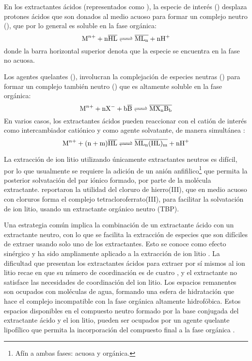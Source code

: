 En los extractantes ácidos (representados como ), la especie de interés () desplaza protones ácidos que son donados al medio acuoso para formar un complejo neutro (), que por lo general es soluble en la fase orgánica:
\begin{equation}
    \ce{M^{n+} + n\overline{HL} <=> \overline{ML_n} + nH^+}
\end{equation}
donde la barra horizontal superior denota que la especie se encuentra en la fase no acuosa. 

Los agentes quelantes (), involucran la complejación de especies neutras () para formar un complejo también neutro () que es altamente soluble en la fase orgánica:
\begin{equation}
    \ce{M^{n+} + nX^{-} + b\overline{B} <=> \overline{MX_nB_b}}
\end{equation}
En varios casos, los extractantes ácidos pueden reaccionar con el catión de interés como intercambiador catiónico y como agente solvatante, de manera simultánea \citep{Swain2016}:
\begin{equation}
    \ce{M^{n+} + (n + m)\overline{HL} <=> \overline{ML_n(HL)_m} + nH^+}
\end{equation}

La extracción de ion litio utilizando únicamente extractantes neutros es difícil, por lo que usualmente se requiere la adición de un anión anfifilico\footnote{Afín a ambas fases: acuosa y orgánica.} que permita la posterior solvatación del par iónico formado, por parte de la molécula extractante. \citet{Zhou2020} reportaron la utilidad del cloruro de hierro(III), que en medio acuoso con cloruros forma el complejo tetracloroferrato(III), para facilitar la solvatación de ion litio, usando un extractante orgánico neutro (TBP).

Una estrategia común implica la combinación de un extractante ácido con un extractante neutro, con lo que se facilita la extracción de especies que son difíciles de extraer usando solo uno de los extractantes. Esto se conoce como efecto sinérgico y ha sido ampliamente aplicado a la extracción de ion litio \citep{Pranolo2015, Kunugita1989, Harvianto2016}. La dificultad que presentan los extractantes ácidos para extraer por sí mismos al ion litio recae en que su número de coordinación es de cuatro \citep{Kinugasa1994}, y el extractante no satisface las necesidades de coordinación del ion litio. Los espacios remanentes son ocupados con moléculas de agua, formando una esfera de hidratación que hace el complejo incompatible con la fase orgánica altamente hidrofóbica. Estos espacios disponibles en el compuesto neutro formado por la base conjugada del extractante ácido y el ion litio, pueden ser ocupados por un agente quelante lipofílico que permita la incorporación del compuesto final a la fase orgánica \citep{NARBUTT2020}.

